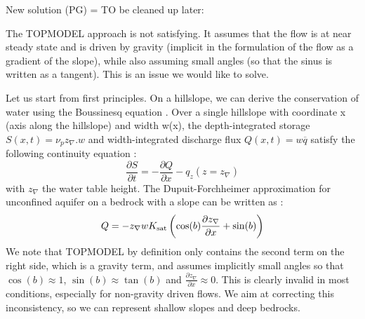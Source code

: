\documentclass[twoside,10pt]{report}
\begin{document}
New solution (PG) = TO be cleaned up later:

The TOPMODEL approach is not satisfying. It assumes that the flow is at near steady state and is driven by gravity (implicit in the formulation of the flow as a gradient of the slope), while also assuming small angles (so that the sinus is written as a tangent). This is an issue we would like to solve.

Let us start from first principles. On a hillslope, we can derive the conservation of water using the Boussinesq equation \citep{Fan1998,Troch2003}. Over a single hillslope with coordinate x (axis along the hillslope) and width w(x), the depth-integrated storage $S(x,t)=\nu_p z_{\nabla}.w$ and width-integrated discharge flux $Q(x,t)=w\overline{q}$ satisfy the following continuity equation \citep{Fan1998,Troch2003}:
\begin{equation}
     \frac{\partial S}{\partial t} = -\frac{\partial Q}{\partial x} - q_z(z=z_{\nabla})
\end{equation}
with $z_{\nabla}$ the water table height.
The Dupuit-Forchheimer approximation for unconfined aquifer on a bedrock with a slope can be written as \cite{Boussinesq1877,Fan1998,Troch2003,Rupp2006}:
\begin{equation}
    Q = - z_{\nabla} w K_{\rm sat} \left( \cos(b)\frac{\partial z_{\nabla}}{\partial x} + \sin(b)  \right)
\end{equation}
We note that TOPMODEL by definition only contains the second term on the right side, which is a gravity term, and assumes implicitly small angles so that $\cos(b) \approx 1$, $\sin(b) \approx \tan(b)$ and  $\frac{\partial z_{\nabla}}{\partial x} \approx 0$. This is clearly invalid in most conditions, especially for non-gravity driven flows. We aim at correcting this inconsistency, so we can represent shallow slopes and deep bedrocks.
\end{document}
